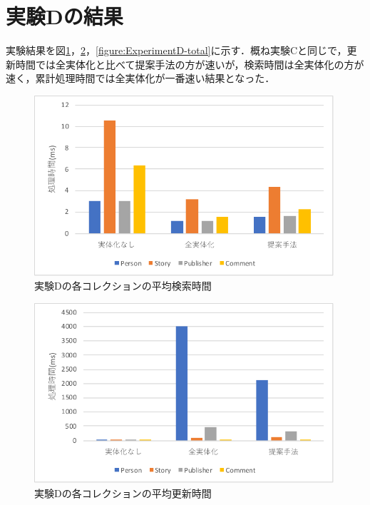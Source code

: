\documentclass[a4paper,11pt]{ujreport}
\begin{document}
\section{実験Dの結果}
実験結果を図\ref{figure:ExperimentD-find}，\ref{figure:ExperimentD-update}，\ref{figure:ExperimentD-total}に示す．概ね実験Cと同じで，更新時間では全実体化と比べて提案手法の方が速いが，検索時間は全実体化の方が速く，累計処理時間では全実体化が一番速い結果となった．
\begin{figure}[htbp]
	\begin{center}
		\includegraphics[width=30em]{src/ExperimentD-find.pdf} %
	\end{center}
	\caption{実験Dの各コレクションの平均検索時間}
	\label{figure:ExperimentD-find}
\end{figure}
\begin{figure}[htbp]
	\begin{center}
		\includegraphics[width=30em]{src/ExperimentD-update.pdf} %
	\end{center}
	\caption{実験Dの各コレクションの平均更新時間}
	\label{figure:ExperimentD-update}
\end{figure}
\end{document}
